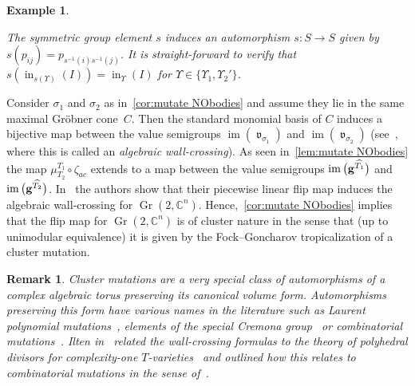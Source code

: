 \documentclass[10pt,a4paper]{amsart}
\newcommand{\thref}[1]{\ref{#1}}
\newtheorem{Example}[Theorem]{Example}
\newtheorem{Remark}[Theorem]{Remark}}
\numberwithin{equation}{section}
\DeclareMathOperator{\init}{in}
\DeclareMathOperator{\Gr}{Gr}
\DeclareMathOperator{\val}{\mathfrak v}
\begin{document}
\begin{Example}
\begin{center}
 \end{center}
The symmetric group element $s$ induces an automorphism $s\colon S\!\to \!S$ given by $s(p_{ij})\!=p_{s^{-1}(i)s^{-1}(j)}$.
It is straight-forward to verify that $s(\init_{s(\Upsilon)}(I))=\init_{\Upsilon}(I)$ for $\Upsilon\in \{\Upsilon_1,\Upsilon_2'\}$.
\end{Example}

Consider $\sigma_1$ and $\sigma_2$ as in~\thref{cor:mutate NObodies} and assume they lie in the same maximal Gr\"obner cone~$C$.
Then the standard monomial basis of $C$ induces a bijective map between the value semigroups $\operatorname{im}(\val_{\sigma_1})$ and $\operatorname{im}(\val_{\sigma_2})$ (see~\cite[Section~4.2]{EH-NObodies}, where this is called an {\it algebraic wall-crossing}).
As seen in~\thref{lem:mutate NObodies} the map $\mu^{T_1}_{T_2}\circ \zeta_{ac}$ extends to a map between the value semigroups $\operatorname{im}\big({\bf g}^{\widehat{T_1}}\big)$ and $\operatorname{im}\big({\bf g}^{\widehat{T_2}}\big)$.
In~\cite[Theorem~5.15]{EH-NObodies} the authors show that their piecewise linear flip map induces the algebraic wall-crossing for $\Gr(2,\mathbb C^n)$.
Hence,~\thref{cor:mutate NObodies} implies that the flip map for $\Gr(2,\mathbb C^n)$ is of cluster nature in the sense that (up to unimodular equivalence) it is given by the Fock--Goncharov tropicalization of a cluster mutation.

\begin{Remark}
Cluster mutations are a very special class of automorphisms of a complex alge\-braic torus preserving its canonical volume form.
Automorphisms preserving this form have various names in the literature such as {\it Laurent polynomial mutations}~\cite{Ilten_mutation}, elements of the {\it special Cremona group}~\cite{Usn13} or {\it combinatorial mutations}~\cite{ACGK12}.
Ilten in~\cite[Appendix]{EH-NObodies} related the wall-crossing formulas to the theory of polyhedral divisors for complexity-one $T$-varieties~\cite{AH06} and outlined how this relates to combinatorial mutations in the sense of~\cite{ACGK12}.
\end{Remark}




\appendix
\end{document}
